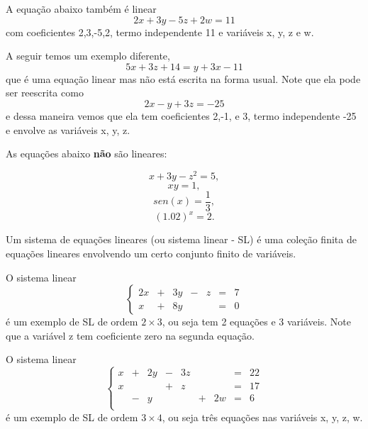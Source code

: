 \begin{ex}
A equação abaixo também é linear
\[
2x+3y-5z+2w=11
\]
com coeficientes 2,3,-5,2, termo independente 11 e variáveis x, y, z e w.
\end{ex}

\begin{ex}
A seguir temos um exemplo diferente,
\[
5x+3z+14=y+3x-11
\] que é uma equação linear mas não está escrita na forma usual. Note que ela pode ser reescrita como
\[
2x-y+3z=-25
\]
e dessa maneira vemos que ela tem coeficientes 2,-1, e 3,  termo independente -25 e envolve as variáveis x, y, z.
\end{ex}

\begin{ex} As equações abaixo {\bf não} são lineares:

\[x+3y-z^2=5,\]
\[xy = 1,\]
\[sen(x)=\frac{1}{3}, \]
\[(1.02)^x=2.\]
\end{ex}

\begin{defn} Um sistema de equações lineares (ou sistema linear - SL) é uma coleção finita de equações lineares envolvendo um certo conjunto finito de  variáveis.
\end{defn}

\begin{ex}
O sistema linear
\begin{equation*}
\left\{
\begin{array}{ccccccc}
2x&+&3y&-&z&=&7 \\
x&+&8y& & &=&0
\end{array}
\right.
\end{equation*}
é um exemplo de SL de ordem $2 \times 3$, ou seja tem 2 equações e 3 variáveis. Note que a variável z tem coeficiente zero na segunda equação.
\end{ex}


\begin{ex}
O sistema linear
\begin{equation*}
\left\{
\begin{array}{ccccccccc}
x&+&2y&-&3z& & &=&22 \\
x& &  &+&z & & &=&17 \\
&-&y & &  &+&2w&=&6 \\
\end{array}
\right.
\end{equation*}
é um exemplo de SL de ordem $3 \times 4$, ou seja três equações nas variáveis x, y, z, w.
\end{ex}


